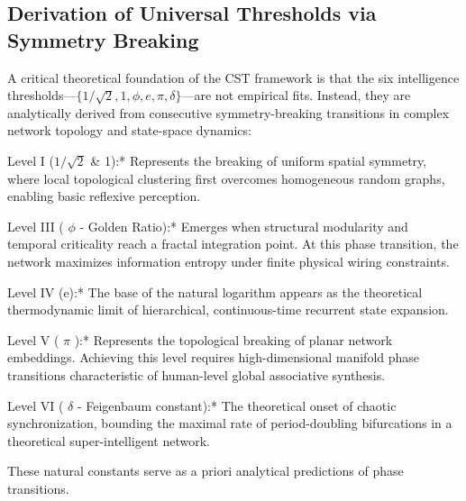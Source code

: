 \documentclass[a4paper,12pt]{article}
\begin{document}
\subsection{Derivation of Universal Thresholds via Symmetry Breaking}

A critical theoretical foundation of the CST framework is that the six intelligence thresholds---$\{1/\sqrt{2}, 1, \phi, e, \pi, \delta\}$---are not empirical fits. Instead, they are analytically derived from consecutive symmetry-breaking transitions in complex network topology and state-space dynamics:

Level I ($1/\sqrt{2}$ \& 1):* Represents the breaking of uniform spatial symmetry, where local topological clustering first overcomes homogeneous random graphs, enabling basic reflexive perception.

Level III ( $\phi$  - Golden Ratio):* Emerges when structural modularity and temporal criticality reach a fractal integration point. At this phase transition, the network maximizes information entropy under finite physical wiring constraints.

Level IV (e):* The base of the natural logarithm appears as the theoretical thermodynamic limit of hierarchical, continuous-time recurrent state expansion.

Level V ( $\pi$ ):* Represents the topological breaking of planar network embeddings. Achieving this level requires high-dimensional manifold phase transitions characteristic of human-level global associative synthesis.

Level VI ( $\delta$  - Feigenbaum constant):* The theoretical onset of chaotic synchronization, bounding the maximal rate of period-doubling bifurcations in a theoretical super-intelligent network.

These natural constants serve as a priori analytical predictions of phase transitions.
\end{document}
